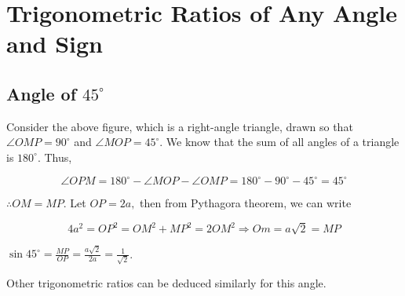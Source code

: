 \chapter{Trigonometric Ratios of Any Angle and Sign}
\section{Angle of $45^\circ$}
\begin{center}
\end{center}

Consider the above figure, which is a right-angle triangle, drawn so that $\angle OMP=90^\circ$ and $\angle MOP=45^\circ$. We know
that the sum of all angles of a triangle is $180^\circ$. Thus,

$$\angle OPM = 180^\circ - \angle MOP - \angle OMP = 180^\circ - 90^\circ - 45^\circ = 45^\circ$$

$\therefore OM = MP$. Let $OP=2a,$ then from Pythagora theorem, we can write

$$4a^2 = OP^2 = OM^2 + MP^2 = 2OM^2 \Rightarrow Om = a\sqrt{2} = MP$$

$\sin45^\circ = \frac{MP}{OP} = \frac{a\sqrt{2}}{2a} = \frac{1}{\sqrt{2}}$.

Other trigonometric ratios can be deduced similarly for this angle.

